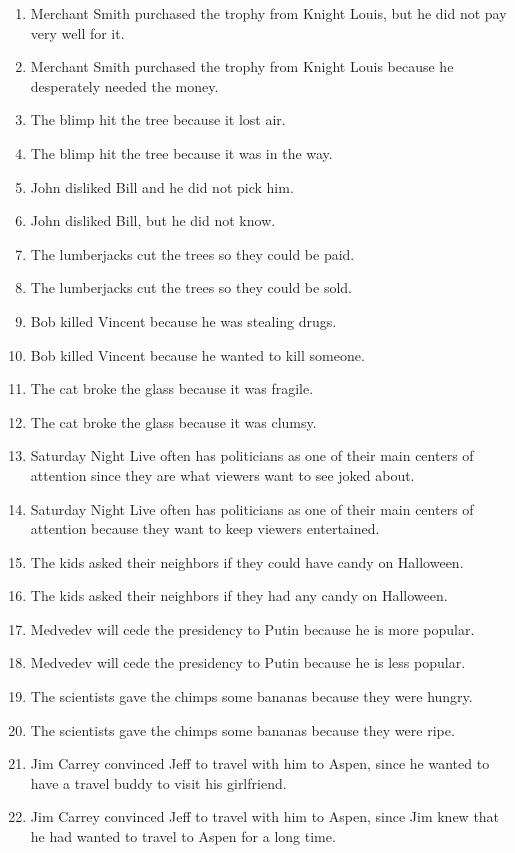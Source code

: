 \documentclass{article}
\begin{document}
\begin{enumerate}
	\item Merchant Smith purchased the trophy from Knight Louis, but he did not pay very well for it.
	\item Merchant Smith purchased the trophy from Knight Louis because he desperately needed the money.
	\item The blimp hit the tree because it lost air.
	\item The blimp hit the tree because it was in the way.
	\item John disliked Bill and he did not pick him.
	\item John disliked Bill, but he did not know.
	\item The lumberjacks cut the trees so they could be paid.
	\item The lumberjacks cut the trees so they could be sold.
	\item Bob killed Vincent because he was stealing drugs.
	\item Bob killed Vincent because he wanted to kill someone.
	\item The cat broke the glass because it was fragile.
	\item The cat broke the glass because it was clumsy.
	\item Saturday Night Live often has politicians as one of their main centers of attention since they are what viewers want to see joked about.
	\item Saturday Night Live often has politicians as one of their main centers of attention because they want to keep viewers entertained.
	\item The kids asked their neighbors if they could have candy on Halloween.
	\item The kids asked their neighbors if they had any candy on Halloween.
	\item Medvedev will cede the presidency to Putin because he is more popular.
	\item Medvedev will cede the presidency to Putin because he is less popular.
	\item The scientists gave the chimps some bananas because they were hungry.
	\item The scientists gave the chimps some bananas because they were ripe.
	\item Jim Carrey convinced Jeff to travel with him to Aspen, since he wanted to have a travel buddy to visit his girlfriend.
	\item Jim Carrey convinced Jeff to travel with him to Aspen, since Jim knew that he had wanted to travel to Aspen for a long time.

\end{enumerate}
\end{document}
